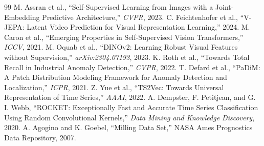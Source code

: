 \documentclass[10pt,journal,compsoc]{IEEEtran}
\begin{document}
\begin{thebibliography}{99}
 M. Assran et al., ``Self-Supervised Learning from Images with a Joint-Embedding Predictive Architecture,'' \emph{CVPR}, 2023.
 C. Feichtenhofer et al., ``V-JEPA: Latent Video Prediction for Visual Representation Learning,'' 2024.
 M. Caron et al., ``Emerging Properties in Self-Supervised Vision Transformers,'' \emph{ICCV}, 2021.
 M. Oquab et al., ``DINOv2: Learning Robust Visual Features without Supervision,'' \emph{arXiv:2304.07193}, 2023.
 K. Roth et al., ``Towards Total Recall in Industrial Anomaly Detection,'' \emph{CVPR}, 2022.
 T. Defard et al., ``PaDiM: A Patch Distribution Modeling Framework for Anomaly Detection and Localization,'' \emph{ICPR}, 2021.
 Z. Yue et al., ``TS2Vec: Towards Universal Representation of Time Series,'' \emph{AAAI}, 2022.
 A. Dempster, F. Petitjean, and G. I. Webb, ``ROCKET: Exceptionally Fast and Accurate Time Series Classification Using Random Convolutional Kernels,'' \emph{Data Mining and Knowledge Discovery}, 2020.
 A. Agogino and K. Goebel, ``Milling Data Set,'' NASA Ames Prognostics Data Repository, 2007.
\end{thebibliography}
\end{document}
